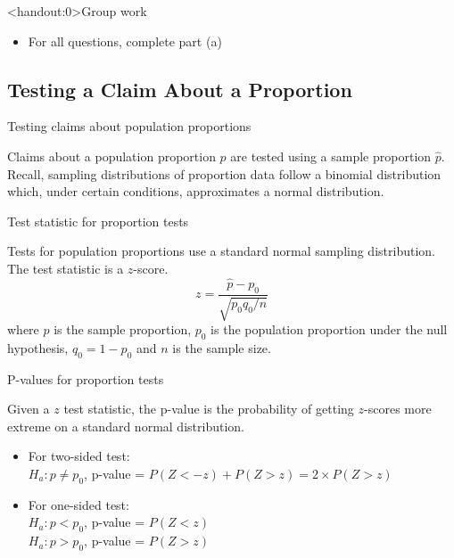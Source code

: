 \documentclass[xcolor=table]{beamer}
\begin{document}
\begin{frame}<handout:0>{Group work}
\begin{block}{}
\large
\begin{itemize}
\item For all questions, complete part (a)
\end{itemize}
\end{block}
\end{frame}


\subsection{Testing a Claim About a Proportion}

\begin{frame}{Testing claims about population proportions}
\begin{block}{}
\large
Claims about a population proportion $p$ are tested using a sample proportion $\hat p$.\\
\medskip
Recall, sampling distributions of proportion data follow a binomial distribution which, under certain conditions, approximates a normal distribution.\\
\end{block}
\end{frame}

\begin{frame}{Test statistic for proportion tests}
\begin{block}{}
\large
Tests for population proportions use a standard normal sampling distribution. The test statistic is a $z$-score.
\[z = \frac {\hat p - p_0}{\sqrt{p_0q_0/n}}\]
where $\hat p$ is the sample proportion, $p_0$ is the population proportion under the null hypothesis, $q_0=1-p_0$ and $n$ is the sample size.
\end{block}

\end{frame}


\begin{frame}{P-values for proportion tests}
\begin{block}{}
\large
Given a $z$ test statistic, the p-value is the probability of getting $z$-scores more extreme on a standard normal distribution.
\begin{itemize}
\pause\item For two-sided test:\\ 
$H_a: p \ne p_0$, p-value = $P(Z<-z) + P(Z > z) = 2 \times P(Z > z)$
\pause\item For one-sided test:\\
$H_a: p < p_0$, p-value = $P(Z < z)$\\
$H_a: p > p_0$, p-value = $P(Z > z)$
\end{itemize}
\end{block}
\end{frame}
\end{document}
